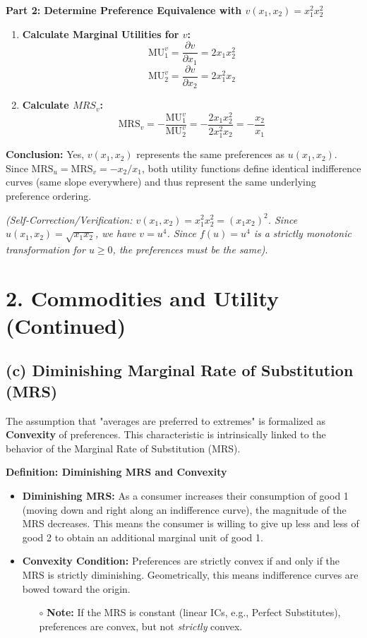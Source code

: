 \documentclass{article}
\begin{document}
\textbf{Part 2: Determine Preference Equivalence with $v(x_1, x_2) = x_1^2 x_2^2$}
\begin{enumerate}
    \item \textbf{Calculate Marginal Utilities for $v$:}
    \[ \text{MU}_1^v = \frac{\partial v}{\partial x_1} = 2x_1 x_2^2 \]
    \[ \text{MU}_2^v = \frac{\partial v}{\partial x_2} = 2x_1^2 x_2 \]
    \item \textbf{Calculate $MRS_v$:}
    \[ \text{MRS}_v = -\frac{\text{MU}_1^v}{\text{MU}_2^v} = -\frac{2x_1 x_2^2}{2x_1^2 x_2} = -\frac{x_2}{x_1} \]
\end{enumerate}

\textbf{Conclusion:} Yes, $v(x_1, x_2)$ represents the same preferences as $u(x_1, x_2)$. Since $\text{MRS}_u = \text{MRS}_v = -x_2/x_1$, both utility functions define identical indifference curves (same slope everywhere) and thus represent the same underlying preference ordering.

\textit{(Self-Correction/Verification: $v(x_1, x_2) = x_1^2 x_2^2 = (x_1 x_2)^2$. Since $u(x_1, x_2) = \sqrt{x_1 x_2}$, we have $v = u^4$. Since $f(u)=u^4$ is a strictly monotonic transformation for $u \geq 0$, the preferences must be the same)}.

\hrulefill

\section*{2. Commodities and Utility (Continued)}

\subsection*{(c) Diminishing Marginal Rate of Substitution (MRS)}

The assumption that "averages are preferred to extremes" is formalized as \textbf{Convexity} of preferences. This characteristic is intrinsically linked to the behavior of the Marginal Rate of Substitution (MRS).

\textbf{Definition: Diminishing MRS and Convexity}

\begin{itemize}
    \item \textbf{Diminishing MRS:} As a consumer increases their consumption of good 1 (moving down and right along an indifference curve), the magnitude of the MRS decreases. This means the consumer is willing to give up less and less of good 2 to obtain an additional marginal unit of good 1.
    \item \textbf{Convexity Condition:} Preferences are strictly convex if and only if the MRS is strictly diminishing. Geometrically, this means indifference curves are bowed toward the origin.
    \begin{itemize}
        \item[$\circ$] \textbf{Note:} If the MRS is constant (linear ICs, e.g., Perfect Substitutes), preferences are convex, but not \textit{strictly} convex.
    \end{itemize}
\end{itemize}
\end{document}

